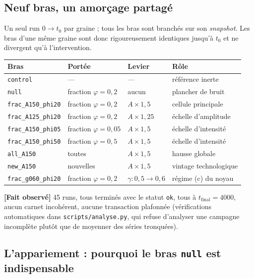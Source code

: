 \documentclass[11pt,a4paper]{article}
\newcommand{\code}[1]{\texttt{#1}}
\newcommand{\fait}{\textbf{[Fait observé]}}
\begin{document}
\subsection{Neuf bras, un amorçage partagé}

Un seul run $0 \to t_0$ par graine ; tous les bras sont branchés sur son
\emph{snapshot}. Les bras d'une même graine sont donc rigoureusement
identiques jusqu'à $t_0$ et ne divergent qu'à l'intervention.

\begin{center}\footnotesize
\begin{tabular}{@{}llll@{}}
\toprule
\textbf{Bras} & \textbf{Portée} & \textbf{Levier} & \textbf{Rôle} \\
\midrule
\code{control} & --- & --- & référence inerte \\
\code{null} & fraction $\varphi=0{,}2$ & aucun & plancher de bruit \\
\code{frac\_A150\_phi20} & fraction $\varphi=0{,}2$ & $A\times1{,}5$ & cellule principale \\
\code{frac\_A125\_phi20} & fraction $\varphi=0{,}2$ & $A\times1{,}25$ & échelle d'amplitude \\
\code{frac\_A150\_phi05} & fraction $\varphi=0{,}05$ & $A\times1{,}5$ & échelle d'intensité \\
\code{frac\_A150\_phi50} & fraction $\varphi=0{,}5$ & $A\times1{,}5$ & échelle d'intensité \\
\code{all\_A150} & toutes & $A\times1{,}5$ & hausse globale \\
\code{new\_A150} & nouvelles & $A\times1{,}5$ & vintage technologique \\
\code{frac\_g060\_phi20} & fraction $\varphi=0{,}2$ & $\gamma: 0{,}5\to0{,}6$ & régime (c) du noyau \\
\bottomrule
\end{tabular}
\end{center}

\fait{} 45 runs, tous terminés avec le statut \code{ok}, tous à
$t_{\text{final}} = 4000$, aucun carnet incohérent, aucune transaction
plafonnée (vérifications automatiques dans \code{scripts/analyse.py}, qui
refuse d'analyser une campagne incomplète plutôt que de moyenner des
séries tronquées).

\subsection{L'appariement : pourquoi le bras \code{null} est indispensable}
\end{document}
